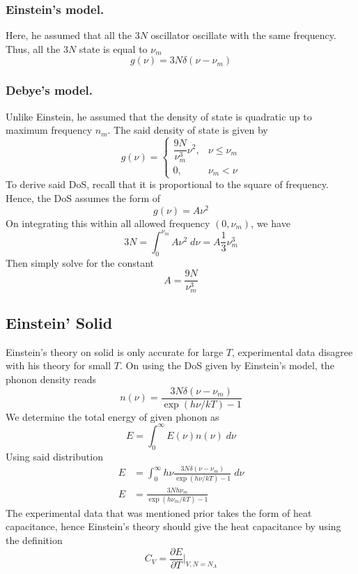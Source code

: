 \documentclass[../../../Main.tex]{subfiles}
\begin{document}
\subsubsection*{Einstein's model.} Here, he assumed that all the $3N$ oscillator oscillate with the same frequency. Thus, all the $3N$ state is equal to $\nu_m$
\begin{equation*}
    g(\nu)=3N\delta(\nu-\nu_m)
\end{equation*}

\subsubsection*{Debye's model.} Unlike Einstein, he assumed that the density of state is quadratic up to maximum frequency $n_m$. The said density of state is given by 
\begin{equation*}
    g(\nu)=\begin{cases}
        \dfrac{9N}{\nu_m^3}\nu^2,&\nu\leq\nu_m\\
        0,&\nu_m<\nu
    \end{cases}
\end{equation*}
To derive said DoS, recall that it is proportional to the square of frequency. Hence, the DoS assumes the form of 
\begin{equation*}
    g(\nu)=A\nu^2
\end{equation*}
On integrating this within all allowed frequency $(0,\nu_m)$, we have 
\begin{equation*}
    3N=\int_{0}^{\nu_m}A\nu^2\;d\nu=A\frac{1}{3}\nu_m^3
\end{equation*}
Then simply solve for the constant 
\begin{equation*}
    A=\frac{9N}{\nu_m^3}
\end{equation*}

\subsection*{Einstein' Solid}
Einstein's theory on solid is only accurate for large $T$, experimental data disagree with his theory for small $T$. On using the DoS given by Einstein's model, the phonon density reads 
\begin{equation*}
    n(\nu)=\frac{3N\delta(\nu-\nu_m)}{\exp(h\nu/kT)-1}
\end{equation*}
We determine the total energy of given phonon as 
\begin{equation*}
    E=\int_{0}^{\infty}E(\nu)n(\nu)\;d\nu
\end{equation*}
Using said distribution
\begin{align*}
    E&=\int_{0}^{\infty}h\nu \frac{3N\delta(\nu-\nu_m)}{\exp(h\nu/kT)-1}\;d\nu\\
    E&=\frac{3Nh\nu_m}{\exp(h\nu_m/kT)-1}
\end{align*}
The experimental data that was mentioned prior takes the form of heat capacitance, hence Einstein's theory should give the heat capacitance by using the definition 
\begin{equation*}
    C_V=\frac{\partial E}{\partial T}\bigg|_{V,N=N_A}
\end{equation*}
\end{document}
